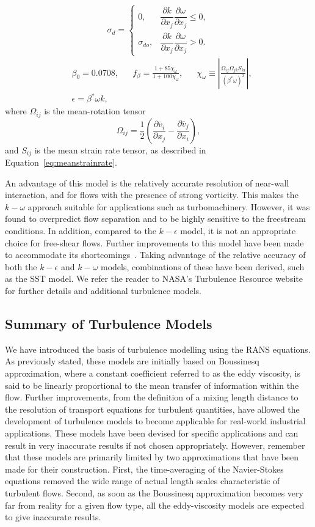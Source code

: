 \[
    \sigma_{d} = 
\begin{cases}
    0,  &\dfrac{\partial k}{\partial x_j} \dfrac{\partial\omega}{\partial x_j}  \leq 0, \\
    \sigma_{do}, &\dfrac{\partial k}{\partial x_j} \dfrac{\partial\omega}{\partial x_j} > 0.
\end{cases}
\]
\begin{align}
    & \beta_0 = 0.0708, & & f_\beta = \frac{1+85\chi_\omega}{1+100\chi_\omega}, & & \chi_\omega\equiv \left|\frac{\Omega_{ij}\Omega_{jk}S_{ki}}{\left(\beta^* \omega\right)^3}\right|, \\
    & \epsilon = \beta^* \omega k, 
\end{align}
where $\Omega_{ij}$ is the mean-rotation tensor
\begin{equation}
    \Omega_{ij} = \frac{1}{2} \left( \frac{\partial \overline v_i}{\partial x_j}
    -\frac{\partial \overline v_j}{\partial x_i}\right),
\end{equation}
and $S_{ij}$ is the mean strain rate tensor, as described in Equation~\ref{eq:meanstrainrate}.

An advantage of this model is the relatively accurate resolution of near-wall interaction, and for flows with the presence of strong vorticity. This makes the $k-\omega$ approach suitable for applications such as turbomachinery. However, it was found to overpredict flow separation and to be highly sensitive to the freestream conditions. In addition, compared to the $k-\epsilon$ model, it is not an appropriate choice for free-shear flows. Further improvements to this model have been made to accommodate its shortcomings~\cite{}. Taking advantage of the relative accuracy of both the $k-\epsilon$ and $k-\omega$ models, combinations of these have been derived, such as the SST model. We refer the reader to NASA's Turbulence Resource website for further details and additional turbulence models.

\subsection{Summary of Turbulence Models}
We have introduced the basis of turbulence modelling using the RANS equations. As previously stated, these models are initially based on Boussinesq approximation, where a constant coefficient referred to as the eddy viscosity, is said to be linearly proportional to the mean transfer of information within the flow. Further improvements, from the definition of a mixing length distance to the resolution of transport equations for turbulent quantities, have allowed the development of turbulence models to become applicable for real-world industrial applications. These models have been devised for specific applications and can result in very inaccurate results if not chosen appropriately. However, remember that these models are primarily limited by two approximations that have been made for their construction. First, the time-averaging of the Navier-Stokes equations removed the wide range of actual length scales characteristic of turbulent flows. Second, as soon as the Boussinesq approximation becomes very far from reality for a given flow type, all the eddy-viscosity models are expected to give inaccurate results.

